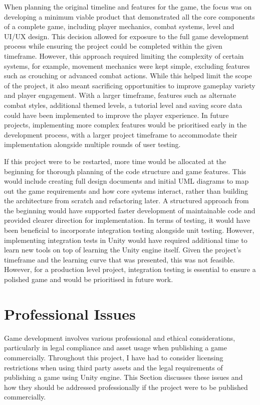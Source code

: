 \documentclass[10pt]{final_report}
\begin{document}
When planning the original timeline and features for the game, the focus was on developing a minimum viable product that demonstrated all the core components of a complete game, including player mechanics, combat systems, level and UI/UX design. This decision allowed for exposure to the full game development process while ensuring the project could be completed within the given timeframe. However, this approach required limiting the complexity of certain systems, for example, movement mechanics were kept simple, excluding features such as crouching or advanced combat actions. While this helped limit the scope of the project, it also meant sacrificing opportunities to improve gameplay variety and player engagement. With a larger timeframe, features such as alternate combat styles, additional themed levels, a tutorial level and saving score data could have been implemented to improve the player experience. In future projects, implementing more complex features would be prioritised early in the development process, with a larger project timeframe to accommodate their implementation alongside multiple rounds of user testing. \newline

If this project were to be restarted, more time would be allocated at the beginning for thorough planning of the code structure and game features. This would include creating full design documents and initial UML diagrams to map out the game requirements and how core systems interact, rather than building the architecture from scratch and refactoring later. A structured approach from the beginning would have supported faster development of maintainable code and provided clearer direction for implementation.\newline
In terms of testing, it would have been beneficial to incorporate integration testing alongside unit testing. However, implementing integration tests in Unity would have required additional time to learn new tools on top of learning the Unity engine itself. Given the project's timeframe and the learning curve that was presented, this was not feasible. However, for a production level project, integration testing is essential to ensure a polished game and would be prioritised in future work.

\chapter{Professional Issues}
Game development involves various professional and ethical considerations, particularly in legal compliance and asset usage when publishing a game commercially. Throughout this project, I have had to consider licensing restrictions when using third party assets and the legal requirements of publishing a game using Unity engine. This Section discusses these issues and how they should be addressed professionally if the project were to be published commercially. \newline
\end{document}
